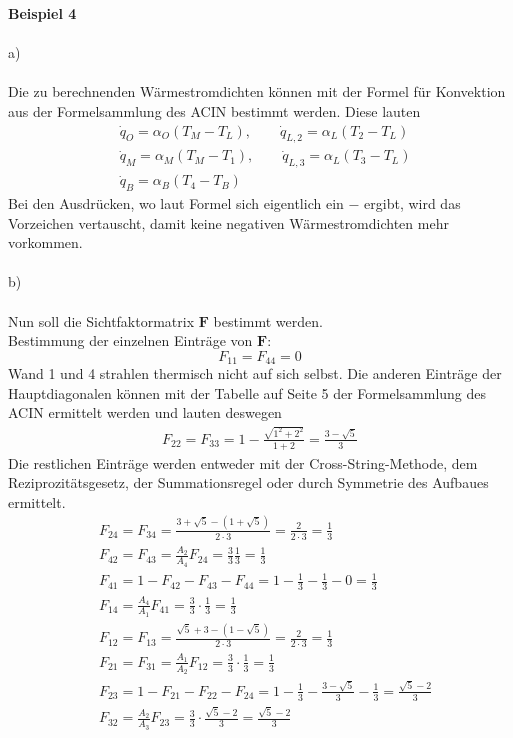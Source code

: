 \newpage
\noindent
\textbf{Beispiel 4} \\ \\
a) \\ \\
Die zu berechnenden Wärmestromdichten können mit der Formel für Konvektion aus der Formelsammlung des ACIN bestimmt werden. Diese lauten
\begin{align*}
	&\dot{q}_O = \alpha_O \left(T_M - T_L\right) , \qquad \dot{q}_{L,2} = \alpha_L \left(T_2 - T_L\right) \\
	&\dot{q}_M = \alpha_M \left(T_M - T_1\right) , \qquad \dot{q}_{L,3} = \alpha_L \left(T_3 - T_L\right) \\
	&\dot{q}_B = \alpha_B \left(T_4 - T_B\right)
\end{align*}
Bei den Ausdrücken, wo laut Formel sich eigentlich ein \(-\) ergibt, wird das Vorzeichen vertauscht, damit keine negativen Wärmestromdichten mehr vorkommen. \\ \\
b) \\ \\
Nun soll die Sichtfaktormatrix \(\textbf{F}\) bestimmt werden.\\
Bestimmung der einzelnen Einträge von \(\textbf{F}\):
\[
	F_{11} = F_{44} = 0
\]
Wand 1 und 4 strahlen thermisch nicht auf sich selbst. Die anderen Einträge der Hauptdiagonalen können mit der Tabelle auf Seite 5 der Formelsammlung des ACIN ermittelt werden und lauten deswegen
\begin{align*}
	F_{22} = F_{33} = 1 -\frac{\sqrt{1^2+2^2}}{1+2} = \frac{3 - \sqrt{5}}{3}
\end{align*}
Die restlichen Einträge werden entweder mit der Cross-String-Methode, dem Reziprozitätsgesetz, der Summationsregel oder durch Symmetrie des Aufbaues ermittelt.
\begin{align*}
	&F_{24} = F_{34} = \frac{3 + \sqrt{5} - \left(1 + \sqrt{5}\right)}{2\cdot3} = \frac{2}{2 \cdot 3} = \frac{1}{3} \\
	&F_{42} = F_{43} = \frac{A_2}{A_4}F_{24} = \frac{3}{3} \frac{1}{3} = \frac{1}{3} \\
	&F_{41} = 1 - F_{42} - F_{43} - F_{44} = 1 - \frac{1}{3} - \frac{1}{3} - 0 = \frac{1}{3} \\
	&F_{14} = \frac{A_4}{A_1}F_{41} = \frac{3}{3} \cdot \frac{1}{3} = \frac{1}{3} \\
	&F_{12} = F_{13} = \frac{\sqrt{5} + 3 - \left(1 - \sqrt{5}\right)}{2\cdot 3} = \frac{2}{2 \cdot 3} = \frac{1}{3} \\
	&F_{21} = F_{31} = \frac{A_1}{A_2}F_{12} = \frac{3}{3}\cdot \frac{1}{3} = \frac{1}{3} \\
	&F_{23} = 1 - F_{21} - F_{22} - F_{24} = 1 - \frac{1}{3} -\frac{3 - \sqrt{5}}{3} - \frac{1}{3} = \frac{\sqrt{5} - 2}{3} \\
	&F_{32} = \frac{A_2}{A_3}F_{23} = \frac{3}{3} \cdot \frac{\sqrt{5} - 2}{3} = \frac{\sqrt{5} - 2}{3}
\end{align*}

